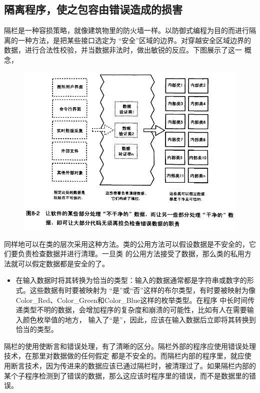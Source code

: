 \documentclass{article}
\begin{document}
\subsection{隔离程序，使之包容由错误造成的损害}
隔栏是一种容损策略，就像建筑物里的防火墙一样。以防御式编程为目的而进行隔离的一种方法，是把某些接口选定为
“安全”区域的边界。对穿越安全区域边界的数据，进行合法性校验，并当数据非法时，做出敏锐的反应。下图展示了这一
概念，
\begin{figure}[htb]
    \centering
    \includegraphics[width=15cm]{figure11.PNG}
\end{figure}
同样地可以在类的层次采用这种方法。类的公用方法可以假设数据是不安全的，它们要负责检查数据并进行清理。一旦类
的公用方法接受了数据，那么类的私用方法就可以假定数据都是安全的了。
\begin{itemize}
    \item 在输入数据时将其转换为恰当的类型：输入的数据通常都是字符串或数字的形式。这些数据有时要被映射为
    “是”或“否”这样的布尔类型，有时要被映射为像Color\_Red、Color\_Green和Color\_Blue这样的枚举类型。在程序
    中长时间传递类型不明的数据，会增加程序的复杂度和崩溃的可能性，比如有人在需要输入颜色枚举值的地方，
    输入了“是”，因此，应该在输入数据后立即将其转换到恰当的类型。
\end{itemize}
\par
隔栏的使用使断言和错误处理，有了清晰的区分。隔栏外部的程序应使用错误处理技术，在那里对数据做的任何假定
都是不安全的。而隔栏内部的程序里，就应使用断言技术，因为传进来的数据应该已通过隔栏时，被清理过了。如果隔栏内部的
某个子程序检测到了错误的数据，那么这应该时程序里的错误，而不是数据里的错误。
\end{document}
